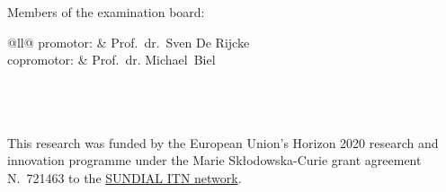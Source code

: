 \clearpage
\thispagestyle{empty}
\null%
\label{thesis:committee}
\vfill
{}

\noindent Members of the examination board:

\medskip\noindent
\begin{tabular}{@{}ll@{}}
  \quad{}promotor: & Prof.\ dr.\ Sven De Rijcke \\
  \quad{}copromotor: & Prof.\ dr. Michael\ Biel\\
\\
 \\
\\
\end{tabular}

This research was funded by the European Union's Horizon 2020 research and innovation programme under the Marie Sk\l odowska-Curie
grant agreement N.~721463 to the \href{www.astro.rug.nl/~sundial}{SUNDIAL ITN network}.
